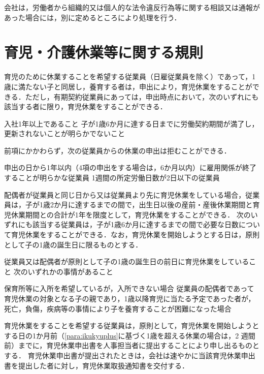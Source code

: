\documentclass[11pt,a4paper]{jsarticle}
\begin{document}
会社は，労働者から組織的又は個人的な法令違反行為等に関する相談又は通報があった場合には，別に定めるところにより処理を行う．



\clearpage
\section{育児・介護休業等に関する規則}

育児のために休業することを希望する従業員（日雇従業員を除く）であって，1歳に満たない子と同居し，養育する者は，申出により，育児休業をすることができる．ただし，有期契約従業員にあっては，申出時点において，次のいずれにも該当する者に限り，育児休業をすることができる．
\label{para:ChildcareLayoff}
\begin{enumerate}
	\itm 入社1年以上であること
	\itm 子が1歳6か月に達する日までに労働契約期間が満了し，更新されないことが明らかでないこと
\end{enumerate}
\term 前項にかかわらず，次の従業員からの休業の申出は拒むことができる．
\begin{enumerate}
	\itm 申出の日から1年以内（4項の申出をする場合は，6か月以内）に雇用関係が終了することが明らかな従業員
	\itm 1週間の所定労働日数が2日以下の従業員
\end{enumerate}
\term 配偶者が従業員と同じ日から又は従業員より先に育児休業をしている場合，従業員は，子が1歳2か月に達するまでの間で，出生日以後の産前・産後休業期間と育児休業期間との合計が1年を限度として，育児休業をすることができる．
\label{para:ikukyuplus}
\term 次のいずれにも該当する従業員は，子が1歳6か月に達するまでの間で必要な日数について育児休業をすることができる．なお，育児休業を開始しようとする日は，原則として子の1歳の誕生日に限るものとする．
\begin{enumerate}
	\itm 従業員又は配偶者が原則として子の1歳の誕生日の前日に育児休業をしていること
	\itm 次のいずれかの事情があること
	\begin{enumerate}
		\itm 保育所等に入所を希望しているが，入所できない場合
		\itm 従業員の配偶者であって育児休業の対象となる子の親であり，1歳以降育児に当たる予定であった者が，死亡，負傷，疾病等の事情により子を養育することが困難になった場合
	\end{enumerate}
\end{enumerate}
\term 育児休業をすることを希望する従業員は，原則として，育児休業を開始しようとする日の1か月前（\ref{para:ikukyuplus}に基づく1歳を超える休業の場合は，2 週間前）までに，育児休業申出書を人事担当者に提出することにより申し出るものとする．
\term 育児休業申出書が提出されたときは，会社は速やかに当該育児休業申出書を提出した者に対し，育児休業取扱通知書を交付する．
\end{document}
